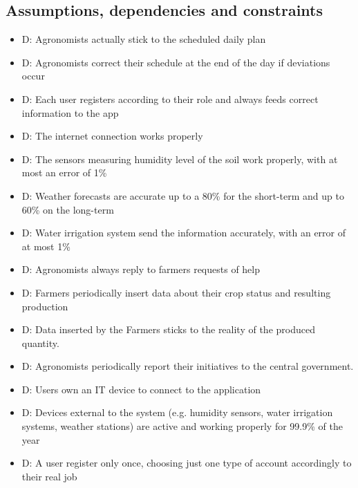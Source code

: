 \documentclass[table, 12pt]{article}
\begin{document}
\subsection{Assumptions, dependencies and constraints}
\begin{itemize}
    \item {}D: Agronomists actually stick to the scheduled daily plan
    \item {}D: Agronomists correct their schedule at the end of the day if deviations occur
    \item {}D: Each user registers according to their role and always feeds correct information to the app
    \item {}D: The internet connection works properly
    \item {}D: The sensors measuring humidity level of the soil work properly, with at most an error of 1\%
    \item {}D: Weather forecasts are accurate up to a 80\% for the short-term and up to 60\% on the long-term
    \item {}D: Water irrigation system send the information accurately, with an error of at most 1\%
    \item {}D: Agronomists always reply to farmers requests of help
    \item {}D: Farmers periodically insert data about their crop status and resulting production
    \item {}D: Data inserted by the Farmers sticks to the reality of the produced quantity.
    \item {}D: Agronomists periodically report their initiatives to the central government.
    \item {}D: Users own an IT device to connect to the application
    \item {}D: Devices external to the system (e.g. humidity sensors, water irrigation systems, weather stations) are active and working properly for 99.9\% of the year
    \item {}D: A user register only once, choosing just one type of account accordingly to their real job
\end{itemize}
\end{document}
